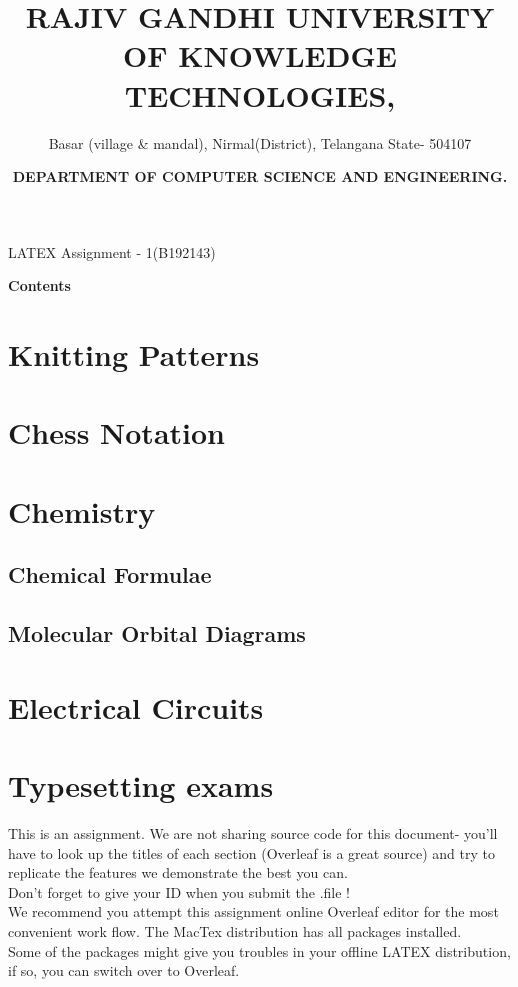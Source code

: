 \documentclass{knittingpattern}
\title{\color{blue}\centering\large\textbf{RAJIV GANDHI UNIVERSITY OF KNOWLEDGE TECHNOLOGIES,}}
\author{\color{blue}\centering\normalsize Basar (village \& mandal), Nirmal(District), Telangana State- 504107 }
\date{ \color{red}\centering \large \textbf{DEPARTMENT OF COMPUTER SCIENCE AND ENGINEERING.}}
\begin{document}
\maketitle
\hline
\vspace{0.5 cm}
\centering
\large{LATEX Assignment - 1(B192143)}
\\
\begin{flushleft}
\Large\textbf{Contents}
\section{Knitting Patterns}
\section{Chess Notation}
\section{Chemistry}
\subsection{Chemical Formulae}
\subsection{Molecular Orbital Diagrams}
\section{Electrical Circuits}
\section{Typesetting exams}
\end{flushleft}
\raggedright
This is an assignment. We are not sharing source code for this document- you'll have to look up the titles of each section (Overleaf is a great source) and try to replicate the features we demonstrate the best you can.\\
\medskip
Don't forget to give your ID when you submit the .file !\\
\medskip
We recommend you attempt this assignment online Overleaf editor for the most convenient work flow. The MacTex distribution has all packages installed.\\
\medskip
Some of the packages might give you troubles in your offline LATEX distribution, if so, you can switch over to Overleaf.\\
\bigskip
\bigskip
\centering
{}
\newpage
{}
\end{document}
